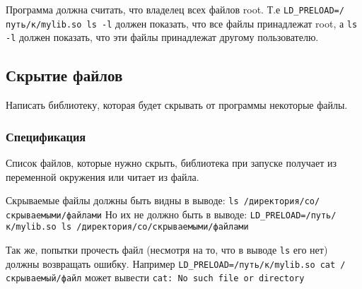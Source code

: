 \documentclass[a4paper,titlepage]{article}
\begin{document}
Программа должна считать, что владелец всех файлов root. Т.е
\texttt{LD\_PRELOAD=/путь/к/mylib.so ls -l} должен показать, что все файлы
принадлежат root, а \texttt{ls -l} должен показать, что эти файлы принадлежат
другому пользователю.

\subsection{Скрытие файлов}
Написать библиотеку, которая будет скрывать от программы некоторые файлы.

\subsubsection{Спецификация}
Список файлов, которые нужно скрыть, библиотека при запуске получает из
переменной окружения или читает из файла.

Скрываемые файлы должны быть видны в выводе:
\texttt{ls /директория/со/скрываемыми/файлами}
Но их не должно быть в выводе:
\texttt{LD\_PRELOAD=/путь/к/mylib.so ls /директория/со/скрываемыми/файлами}

Так же, попытки прочесть файл (несмотря на то, что в выводе \texttt{ls} его нет)
должны возвращать ошибку. Например
\texttt{LD\_PRELOAD=/путь/к/mylib.so cat /скрываемый/файл} может вывести \texttt{cat: No such file or directory}
\end{document}

